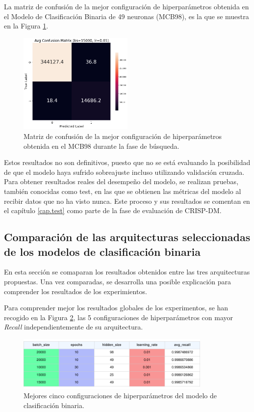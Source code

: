 La matriz de confusión de la mejor configuración de hiperparámetros obtenida en el Modelo de Clasificación Binaria de 49 neuronas (MCB98), es la que se muestra en la Figura \ref{fig:MC_ENT_MCB98}.

\begin{figure}[H]
    \centering
    \includegraphics[width=0.5\textwidth]{./img/modelo/matrices_confusion/MC_ENT_MCB98.png}
    \caption{Matriz de confusión de la mejor configuración de hiperparámetros obtenida en el MCB98 durante la fase de búsqueda.}
    \label{fig:MC_ENT_MCB98}
\end{figure}



Estos resultados no son definitivos, puesto que no se está evaluando la posibilidad de que el modelo haya sufrido sobreajuste incluso utilizando validación cruzada. Para obtener resultados reales del desempeño del modelo, se realizan pruebas, también conocidas como test, en las que se obtienen las métricas del modelo al recibir datos que no ha visto nunca. Este proceso y sus resultados se comentan en el capítulo \ref{cap.test} como parte de la fase de evaluación de CRISP-DM.


\subsection{Comparación de las arquitecturas seleccionadas de los modelos de clasificación binaria} \label{sec:comp.BIN}
En esta sección se comaparan los resultados obtenidos entre las tres arquitecturas propuestas. Una vez comparadas, se desarrolla una posible explicación para comprender los resultados de los experimientos.

Para comprender mejor los resultados globales de los experimentos, se han recogido en la Figura \ref{fig:BINtop5}, las 5 configuraciones de hiperparámetros con mayor \textit{Recall} independientemente de su arquitectura.

\begin{figure}[H]
    \centering
    \includegraphics[width=0.85\textwidth]{./img/modelo/resultados/BINtop5.pdf}
    \caption{Mejores cinco configuraciones de hiperparámetros del modelo de clasificación binaria.}
    \label{fig:BINtop5}
\end{figure}

